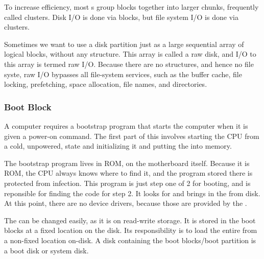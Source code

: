 To increase efficiency, most s group blocks together into larger chunks, frequently called clusters.
Disk I/O is done via blocks, but file system I/O is done via clusters.

Sometimes we want to use a disk partition just as a large sequential array of logical blocks, without any structure.
This array is called a raw disk, and I/O to this array is termed raw I/O.
Because there are no structures, and hence no file syste, raw I/O bypasses all file-system services, such as the buffer cache, file locking, prefetching, space allocation, file names, and directories.

\subsubsection{Boot Block}\label{subsubsec:Boot_Block}
A computer requires a bootstrap program that starts the computer when it is given a power-on command.
The first part of this involves starting the CPU from a cold, unpowered, state and initializing it and putting the  into memory.

The bootstrap program lives in ROM, on the motherboard itself.
Because it is ROM, the CPU always knows where to find it, and the program stored there is protected from infection.
This program is just step one of 2 for booting, and is reponsible for finding the code for step 2.
It looks for and brings in the  from disk.
At this point, there are no device drivers, because those are provided by the .

The  can be changed easily, as it is on read-write storage.
It is stored in the boot blocks at a fixed location on the disk.
Its responsibility is to load the entire  from a non-fixed location on-disk.
A disk containing the boot blocks/boot partition is a boot disk or system disk.



